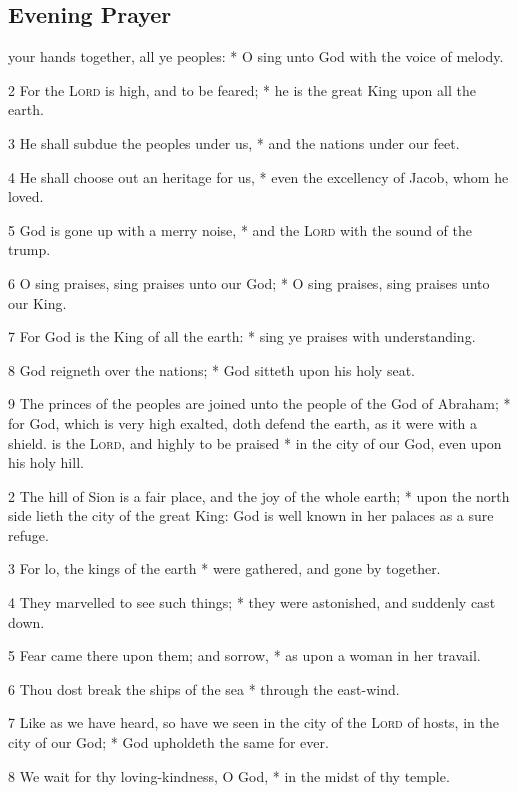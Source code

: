 \subsection{Evening Prayer}
 your hands together, all ye peoples: * O sing unto God with the voice of melody.\par
2 For the {\textsc{Lord}} is high, and to be feared; * he is the great King upon all the earth.\par
3 He shall subdue the peoples under us, * and the nations under our feet.\par
4 He shall choose out an heritage for us, * even the excellency of Jacob, whom he loved.\par
5 God is gone up with a merry noise, * and the {\textsc{Lord}} with the sound of the trump.\par
6 O sing praises, sing praises unto our God; * O sing praises, sing praises unto our King.\par
7 For God is the King of all the earth: * sing ye praises with understanding.\par
8 God reigneth over the nations; * God sitteth upon his holy seat.\par
9 The princes of the peoples are joined unto the people of the God of Abraham; * for God, which is very high exalted, doth defend the earth, as it were with a shield.
 is the {\textsc{Lord}}, and highly to be praised * in the city of our God, even upon his holy hill.\par
2 The hill of Sion is a fair place, and the joy of the whole earth; * upon the north side lieth the city of the great King: God is well known in her palaces as a sure refuge.\par
3 For lo, the kings of the earth * were gathered, and gone by together.\par
4 They marvelled to see such things; * they were astonished, and suddenly cast down.\par
5 Fear came there upon them; and sorrow, * as upon a woman in her travail.\par
6 Thou dost break the ships of the sea * through the east-wind.\par
7 Like as we have heard, so have we seen in the city of the {\textsc{Lord}} of hosts, in the city of our God; * God upholdeth the same for ever.\par
8 We wait for thy loving-kindness, O God, * in the midst of thy temple.\par
